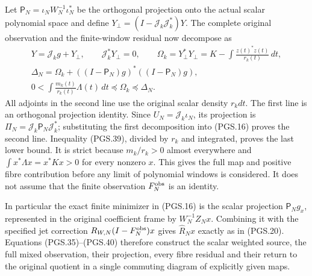 Let \(\mathsf P_N=\iota_NW_N^{-1}\iota_N^*\) be the orthogonal
projection onto the actual scalar polynomial space and define
\(Y_\perp=(I-\mathscr J_k\mathscr J_k^*)Y\). The complete
original observation and the finite-window residual now decompose as
\[
\begin{gathered}
 Y=\mathscr J_kg+Y_\perp,\qquad
 \mathscr J_k^*Y_\perp=0,\qquad
 \Omega_k=Y_\perp^*Y_\perp
      =K-\int\frac{z(t)^*z(t)}{r_k(t)}\,dt,\\
 \Delta_N=\Omega_k+
       ((I-\mathsf P_N)g)^*((I-\mathsf P_N)g),\\
 0<\int\frac{m_k(t)}{r_k(t)}\Lambda(t)\,dt
                  \preceq\Omega_k\preceq\Delta_N.
\end{gathered}
\tag{PGS.40}\label{GraphV2:eq:pgs-fibre-residual}
\]
All adjoints in the second line use the original scalar density
\(r_kdt\). The first line is an orthogonal projection identity.
Since \(U_N=\mathscr J_k\iota_N\), its projection is
\(\Pi_N=\mathscr J_k\mathsf P_N\mathscr J_k^*\); substituting
the first decomposition into (PGS.16) proves the second line.
Inequality (PGS.39), divided by \(r_k\) and integrated, proves
the last lower bound. It is strict because \(m_k/r_k>0\)
almost everywhere and
\(\int x^*\Lambda x=x^*Kx>0\) for every nonzero \(x\).
This gives the full map and positive fibre contribution before any
limit of polynomial windows is considered. It does not assume that
the finite observation \(F_N^{\rm obs}\) is an identity.

In particular the exact finite minimizer in (PGS.16) is the scalar
projection \(\mathsf P_Ng_x\), represented in the original
coefficient frame by \(W_N^{-1}Z_Nx\). Combining it with the
specified jet correction \(R_{W,N}(I-F_N^{\rm obs})x\) gives
\(\widehat R_Nx\) exactly as in (PGS.20). Equations
(PGS.35)--(PGS.40) therefore construct the scalar weighted source,
the full mixed observation, their projection, every fibre residual
and their return to the original quotient in a single commuting
diagram of explicitly given maps.


